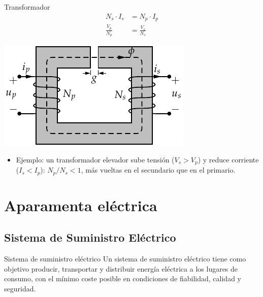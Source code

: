 \documentclass[xcolor={usenames,svgnames,dvipsnames}]{beamer}
\begin{document}
\begin{frame}[label={sec:org71aedc0}]{Transformador}
\begin{align*}
N_{s}\cdot I_{s} &= N_{p}\cdot I_{p}\\
\frac{V_{p}}{N_{p}} &= \frac{V_{s}}{N_{s}}
\end{align*}

\begin{center}
\includegraphics[height=0.3\textheight]{../figs/Transformador2.pdf}
\end{center}

\begin{itemize}
\item Ejemplo: un transformador elevador sube tensión (\(V_{s}>V_{p}\)) y reduce corriente (\(I_{s}<I_{p}\)): \(N_{p}/N_{s}<1\), más vueltas en el secundario que en el primario.
\end{itemize}
\end{frame}


\section{Aparamenta eléctrica}
\label{sec:orgf20dd4c}

\subsection{Sistema de Suministro Eléctrico}
\label{sec:orgd4165cb}
\begin{frame}[label={sec:org9714cef}]{Sistema de suministro eléctrico}
Un \alert{sistema de suministro eléctrico} tiene como objetivo \alert{producir,
transportar y distribuir energía eléctrica} a los lugares de consumo,
con el mínimo coste posible en condiciones de \alert{fiabilidad, calidad y
seguridad}.
\end{frame}
\end{document}
